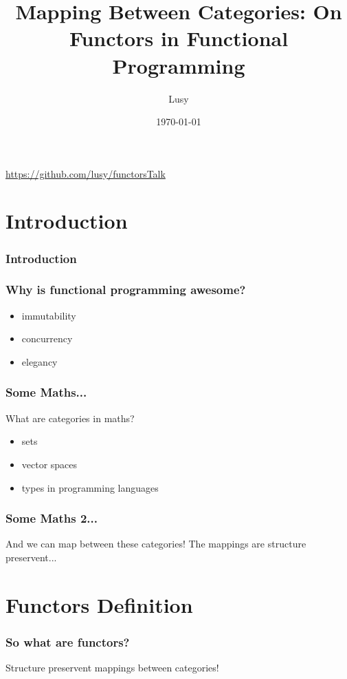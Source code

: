 \documentclass[12pt, xcolor=table]{beamer}
\begin{document}
\title{Mapping Between Categories: On Functors in Functional Programming}
\author{Lusy}
\date{\today}

\begin{frame}
    \titlepage
    \begin{block}
        \tiny \url{https://github.com/lusy/functorsTalk}
    \end{block}
\end{frame}

\section{Introduction} %
\begin{frame}
     \frametitle{Introduction}
\end{frame}

\begin{frame}
    \frametitle{Why is functional programming awesome?}
    \begin{itemize}
        \item immutability
        \item concurrency
        \item elegancy
    \end{itemize}
\end{frame}


\begin{frame}
    \frametitle{Some Maths...}
    What are categories in maths?
    \begin{itemize}
        \item sets
        \item vector spaces
        \item types in programming languages
    \end{itemize}
\end{frame}

\begin{frame}
    \frametitle{Some Maths 2...}
    And we can map between these categories!
    The mappings are structure preservent...
\end{frame}

\section{Functors Definition}
\begin{frame}
    \frametitle{So what are functors?}
    Structure preservent mappings between categories!
\end{frame}
\end{document}
